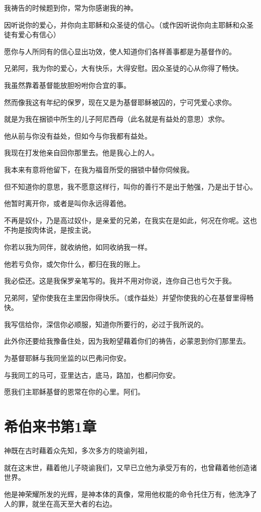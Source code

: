 \documentclass[12pt,oneside]{book}
\begin{document}
我祷告的时候题到你，常为你感谢我的神。

因听说你的爱心，并你向主耶稣和众圣徒的信心。（或作因听说你向主耶稣和众圣徒有爱心有信心）

愿你与人所同有的信心显出功效，使人知道你们各样善事都是为基督作的。

兄弟阿，我为你的爱心，大有快乐，大得安慰。因众圣徒的心从你得了畅快。

我虽然靠着基督能放胆吩咐你合宜的事。

然而像我这有年纪的保罗，现在又是为基督耶稣被囚的，宁可凭爱心求你。

就是为我在捆锁中所生的儿子阿尼西母（此名就是有益处的意思）求你。

他从前与你没有益处，但如今与你我都有益处。

我现在打发他亲自回你那里去。他是我心上的人。

我本来有意将他留下，在我为福音所受的捆锁中替你伺候我。

但不知道你的意思，我不愿意这样行，叫你的善行不是出于勉强，乃是出于甘心。

他暂时离开你，或者是叫你永远得着他。

不再是奴仆，乃是高过奴仆，是亲爱的兄弟，在我实在是如此，何况在你呢。这也不拘是按肉体说，是按主说。

你若以我为同伴，就收纳他，如同收纳我一样。

他若亏负你，或欠你什么，都归在我的账上。

我必偿还。这是我保罗亲笔写的。我并不用对你说，连你自己也亏欠于我。

兄弟阿，望你使我在主里因你得快乐。（或作益处）并望你使我的心在基督里得畅快。

我写信给你，深信你必顺服，知道你所要行的，必过于我所说的。

此外你还要给我豫备住处，因为我盼望藉着你们的祷告，必蒙恩到你们那里去。

为基督耶稣与我同坐监的以巴弗问你安。

与我同工的马可，亚里达古，底马，路加，也都问你安。

愿我们主耶稣基督的恩常在你的心里。阿们。

\chapter{希伯来书第1章}
神既在古时藉着众先知，多次多方的晓谕列祖，

就在这末世，藉着他儿子晓谕我们，又早已立他为承受万有的，也曾藉着他创造诸世界。

他是神荣耀所发的光辉，是神本体的真像，常用他权能的命令托住万有，他洗净了人的罪，就坐在高天至大者的右边。
\end{document}
